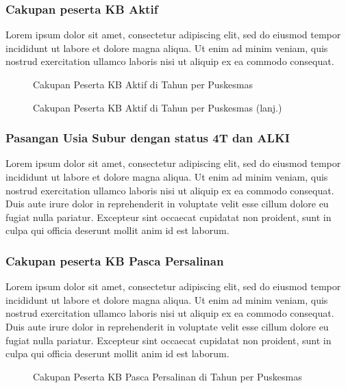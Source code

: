 \subsubsection{Cakupan peserta KB Aktif}
Lorem ipsum dolor sit amet, consectetur adipiscing elit, sed do eiusmod tempor incididunt ut labore et dolore magna aliqua. Ut enim ad minim veniam, quis nostrud exercitation ullamco laboris nisi ut aliquip ex ea commodo consequat.

\begin{figure}[H]
    \centering
    \caption{Cakupan Peserta KB Aktif di \namaKabupaten Tahun \tP per Puskesmas}
    \label{fig:Cakupan-KB-aktif-a}
\end{figure}

\begin{figure}[H]
    \centering
    \caption{Cakupan Peserta KB Aktif di \namaKabupaten Tahun \tP per Puskesmas (lanj.)}
    \label{fig:Cakupan-KB-aktif-b}
\end{figure}


\subsubsection{Pasangan Usia Subur dengan status 4T dan ALKI}
Lorem ipsum dolor sit amet, consectetur adipiscing elit, sed do eiusmod tempor incididunt ut labore et dolore magna aliqua. Ut enim ad minim veniam, quis nostrud exercitation ullamco laboris nisi ut aliquip ex ea commodo consequat. Duis aute irure dolor in reprehenderit in voluptate velit esse cillum dolore eu fugiat nulla pariatur. Excepteur sint occaecat cupidatat non proident, sunt in culpa qui officia deserunt mollit anim id est laborum.

\subsubsection{Cakupan peserta KB Pasca Persalinan}
Lorem ipsum dolor sit amet, consectetur adipiscing elit, sed do eiusmod tempor incididunt ut labore et dolore magna aliqua. Ut enim ad minim veniam, quis nostrud exercitation ullamco laboris nisi ut aliquip ex ea commodo consequat. Duis aute irure dolor in reprehenderit in voluptate velit esse cillum dolore eu fugiat nulla pariatur. Excepteur sint occaecat cupidatat non proident, sunt in culpa qui officia deserunt mollit anim id est laborum.

\begin{figure}[H]
    \centering
    \caption{Cakupan Peserta KB Pasca Persalinan di \namaKabupaten Tahun \tP per Puskesmas}
    \label{fig:Cakupan-KB-pascaSalin-a}
\end{figure}

